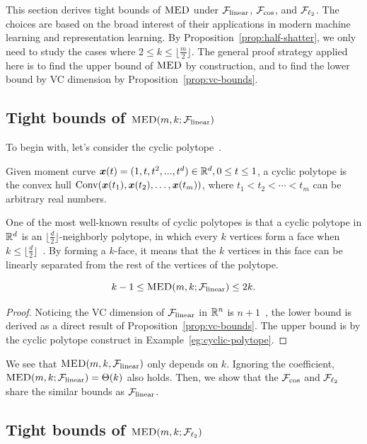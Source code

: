 \documentclass[10pt]{article}
\begin{document}
This section derives tight bounds of $\textsc{MED}$ under $\mathcal{F}_{\rm linear}$, $\mathcal{F}_{\cos}$, and $\mathcal{F}_{\ell_{2}}$. 
The choices are based on the broad interest of their applications in modern machine learning and representation learning. By Proposition~\ref{prop:half-shatter}, we only need to study the cases where $2\leq k \leq \lfloor \frac{m}{2} \rfloor$. The general proof strategy applied here is to find the upper bound of $\textsc{MED}$ by construction, and to find the lower bound by VC dimension by Proposition~\ref{prop:vc-bounds}.

\subsection{Tight bounds of $\textsc{MED}(m, k;\mathcal{F}_{\rm linear})$}\label{sec:linear-bounds}
To begin with, let's consider the cyclic polytope~\cite{ziegler2012lectures}.
\begin{example}\label{eg:cyclic-polytope}
	Given moment curve $\bm{x}(t) = (1, t, t^2, ..., t^d)\in \mathbb{R}^d, 0\leq t\leq 1$, a cyclic polytope is the convex hull ${\rm Conv}(\bm{x}(t_1), \bm{x}(t_2), \dots, \bm{x}(t_m))$, where $t_1 < t_2 < \cdots < t_m$ can be arbitrary real numbers.
\end{example}
One of the most well-known results of cyclic polytopes is that a cyclic polytope in $\mathbb{R}^d$ is an $\lfloor \frac{d}{2} \rfloor$-neighborly polytope, in which every $k$ vertices form a face when $k\leq \lfloor \frac{d}{2} \rfloor$~\cite{ziegler2012lectures}. By forming a $k$-face, it means that the $k$ vertices in this face can be linearly separated from the rest of the vertices of the polytope.

\begin{theorem}\label{thm:linear-lower-upper}
    $$k-1\leq \textsc{MED}(m, k; \mathcal{F}_{\rm linear}) \leq 2k.$$
\end{theorem}
\begin{proof}
Noticing the VC dimension of $\mathcal{F}_{\rm linear}$ in $\mathbb{R}^n$ is $n+1$~\cite{mohri2018foundations}, the lower bound is derived as a direct result of Proposition~\ref{prop:vc-bounds}. The upper bound is by the cyclic polytope construct in Example~\ref{eg:cyclic-polytope}.
\end{proof}

We see that $\textsc{MED}(m, k, \mathcal{F}_{\rm linear})$ only depends on $k$. Ignoring the coefficient, $\textsc{MED}(m, k; \mathcal{F}_{\rm linear}) = \Theta(k)$ also holds. Then, we show that the $\mathcal{F}_{\cos}$ and $\mathcal{F}_{\ell_{2}}$ share the similar bounds as $\mathcal{F}_{\rm linear}$.

\subsection{Tight bounds of $\textsc{MED}(m, k;\mathcal{F}_{\ell_{2}})$}~\label{sec:generalize_linear}
\end{document}
